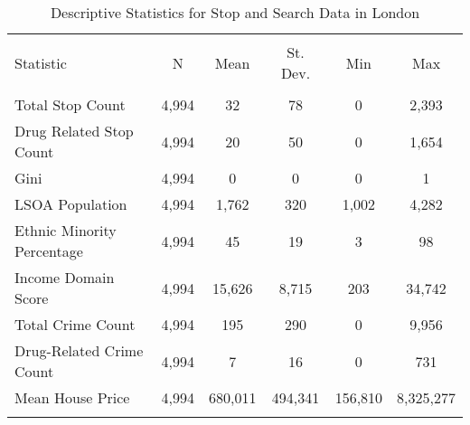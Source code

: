 
\begin{table}[!htbp] \centering 
  \caption{Descriptive Statistics for Stop and Search Data in London} 
  \label{tab:descriptive_london} 
\begin{tabular}{@{\extracolsep{5pt}}lccccc} 
\\[-1.8ex]\hline 
\hline \\[-1.8ex] 
Statistic & \multicolumn{1}{c}{N} & \multicolumn{1}{c}{Mean} & \multicolumn{1}{c}{St. Dev.} & \multicolumn{1}{c}{Min} & \multicolumn{1}{c}{Max} \\ 
\hline \\[-1.8ex] 
Total Stop Count & 4,994 & 32 & 78 & 0 & 2,393 \\ 
Drug Related Stop Count & 4,994 & 20 & 50 & 0 & 1,654 \\ 
Gini & 4,994 & 0 & 0 & 0 & 1 \\ 
LSOA Population & 4,994 & 1,762 & 320 & 1,002 & 4,282 \\ 
Ethnic Minority Percentage & 4,994 & 45 & 19 & 3 & 98 \\ 
Income Domain Score & 4,994 & 15,626 & 8,715 & 203 & 34,742 \\ 
Total Crime Count & 4,994 & 195 & 290 & 0 & 9,956 \\ 
Drug-Related Crime Count & 4,994 & 7 & 16 & 0 & 731 \\ 
Mean House Price & 4,994 & 680,011 & 494,341 & 156,810 & 8,325,277 \\ 
\hline \\[-1.8ex] 
\end{tabular} 
\end{table} 
